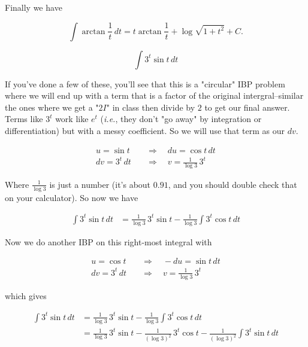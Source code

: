 \documentclass[12pt, letterpaper]{article}
\begin{document}
Finally we have

\begin{equation*}
\boxed{
\int \arctan{\frac{1}{t}} \, dt
  = t \arctan{\frac{1}{t}} + \log{\sqrt{1 + t^2}} + C.
}
\end{equation*}

\newpage

$$ \int 3^{t}\sin{t} \, dt $$

If you've done a few of these, you'll see that this is a "circular" IBP problem where we will end up with a term that is a factor of the original intergral--similar the ones where we get a "$2I$" in class then divide by $2$ to get our final answer. Terms like $3^t$ work like $e^t$ (\emph{i.e.}, they don't "go away" by integration or differentiation) but with a messy coefficient. So we will use that term as our $dv$.

\begin{equation*}
\begin{aligned}
u = \sin{t} \quad &\Rightarrow \quad du = \cos{t} \, dt \\
dv = 3^t \, dt \quad &\Rightarrow \quad v = \tfrac{1}{\log{3}} \, 3^t
\end{aligned}
\end{equation*}

Where $\tfrac{1}{\log{3}}$ is just a number (it's about $0.91$, and you should double check that on your calculator). So now we have

\begin{equation*}
\begin{aligned}
\int 3^{t}\sin{t} \, dt
  &= \tfrac{1}{\log{3}} \, 3^t \sin{t} - \tfrac{1}{\log{3}} \int 3^t \cos{t} \, dt
\end{aligned}
\end{equation*}

Now we do another IBP on this right-most integral with

\begin{equation*}
\begin{aligned}
u = \cos{t} \quad &\Rightarrow \quad -du = \sin{t} \, dt \\
dv = 3^t \, dt \quad &\Rightarrow \quad v = \tfrac{1}{\log{3}} \, 3^t
\end{aligned}
\end{equation*}

which gives

\begin{equation*}
\begin{aligned}
\int 3^{t}\sin{t} \, dt
  &= \tfrac{1}{\log{3}} \, 3^t \sin{t} - \tfrac{1}{\log{3}} \int 3^t \cos{t} \, dt \\[0.2in]
  &= \tfrac{1}{\log{3}} \, 3^t \sin{t} - \tfrac{1}{(\log{3})^2} \, 3^t \cos{t} - \tfrac{1}{(\log{3})^2} \int 3^{t}\sin{t} \, dt
\end{aligned}
\end{equation*}
\end{document}

